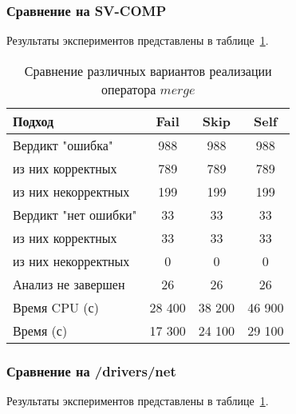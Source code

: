 \subsubsection{Сравнение на SV-COMP}
Результаты экспериментов представлены в таблице~\ref{table-drivers-lock-merge}.

\begin{center}
  \begin{table}[h]\footnotesize
  	\label{table-drivers-lock-merge}
    \caption{Сравнение различных вариантов реализации оператора $merge$}
    \begin{tabular}{ | l | c | c | c |}
      \hline
      Подход         				& Fail 	& Skip 	& Self  	\\ \hline
      Вердикт "ошибка" 				& 988   & 988   & 988       \\ 
  \hspace{0.5cm} из них корректных 	& 789 	& 789 	& 789    	\\ 
  \hspace{0.5cm} из них некорректных & 199 	& 199 	& 199     	\\ \hline
      Вердикт "нет ошибки"  		& 33    & 33    & 33       	\\ 
  \hspace{0.5cm} из них корректных 	& 33 	& 33    & 33      	\\
  \hspace{0.5cm} из них некорректных & 0 	& 0    	& 0     	\\ \hline
      Анализ не завершен       		& 26    & 26    & 26    	\\ \hline
      Время CPU (с)   				& 28 400 & 38 200 & 46 900  \\ 
      Время (с)  					& 17 300 & 24 100 & 29 100  \\
      \hline
    \end{tabular}
  \end{table}
\end{center}

\subsubsection{Сравнение на /drivers/net}
Результаты экспериментов представлены в таблице~\ref{table-drivers-lock-merge}.

